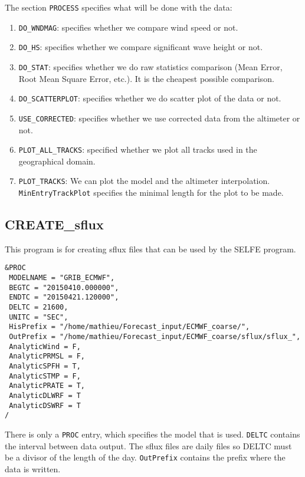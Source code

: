 \documentclass[12pt]{amsart}
\begin{document}
The section {\tt PROCESS} specifies what will be done with the data:
\begin{enumerate}
\item {\tt DO\_WNDMAG}: specifies whether we compare wind speed or not.
\item {\tt DO\_HS}: specifies whether we compare significant wave height or not.
\item {\tt DO\_STAT}: specifies whether we do raw statistics comparison (Mean Error, Root Mean Square Error, etc.). It is the cheapest possible comparison.
\item {\tt DO\_SCATTERPLOT}: specifies whether we do scatter plot of the data or not.
\item {\tt USE\_CORRECTED}: specifies whether we use corrected data from the altimeter or not.
\item {\tt PLOT\_ALL\_TRACKS}: specified whether we plot all tracks used in the geographical domain.
\item {\tt PLOT\_TRACKS}: We can plot the model and the altimeter interpolation. {\tt MinEntryTrackPlot} specifies the minimal length for the plot to be made.
\end{enumerate}


\subsection{CREATE\_sflux}

This program is for creating sflux files that can be used by the SELFE program.
\begin{verbatim}
&PROC
 MODELNAME = "GRIB_ECMWF", 
 BEGTC = "20150410.000000",
 ENDTC = "20150421.120000",
 DELTC = 21600, 
 UNITC = "SEC", 
 HisPrefix = "/home/mathieu/Forecast_input/ECMWF_coarse/", 
 OutPrefix = "/home/mathieu/Forecast_input/ECMWF_coarse/sflux/sflux_", 
 AnalyticWind = F,
 AnalyticPRMSL = F,
 AnalyticSPFH = T,
 AnalyticSTMP = F,
 AnalyticPRATE = T,
 AnalyticDLWRF = T
 AnalyticDSWRF = T
/
\end{verbatim}
There is only a {\tt PROC} entry, which specifies the model that is used. {\tt DELTC} contains the interval between data output. The sflux files are daily files so DELTC must be a divisor of the length of the day.
{\tt OutPrefix} contains the prefix where the data is written.
\end{document}
